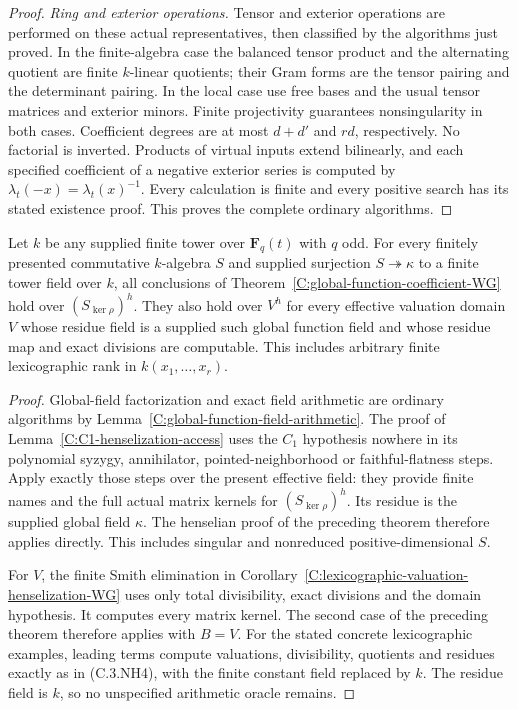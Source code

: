\begin{proof}
\emph{Ring and exterior operations.}
Tensor and exterior operations
are performed on these actual
representatives, then classified
by the algorithms just proved.
In the finite-algebra case the
balanced tensor product and
the alternating quotient are
finite $k$-linear quotients;
their Gram forms are the
tensor pairing and the
determinant pairing.
In the local case use free
bases and the usual tensor
matrices and exterior minors.
Finite projectivity guarantees
nonsingularity in both cases.
Coefficient degrees are at
most $d+d'$ and $rd$,
respectively.
No factorial is inverted.
Products of virtual inputs
extend bilinearly, and each
specified coefficient of a
negative exterior series is
computed by
$\lambda_t(-x)=\lambda_t(x)^{-1}$.
Every calculation is finite
and every positive search
has its stated existence proof.
This proves the complete
ordinary algorithms.
\end{proof}

\begin{corollary}
\label{C:global-function-henselization-WG}
Let $k$ be any supplied finite tower over
$\mathbf F_q(t)$ with $q$ odd.
For every finitely presented commutative
$k$-algebra $S$ and supplied surjection
$S\twoheadrightarrow\kappa$ to a finite
tower field over $k$, all conclusions
of Theorem~\ref{C:global-function-coefficient-WG}
hold over $(S_{\ker\rho})^h$.
They also hold over $V^h$ for every
effective valuation domain $V$ whose
residue field is a supplied such
global function field and whose
residue map and exact divisions
are computable.
This includes arbitrary finite
lexicographic rank in
$k(x_1,\ldots,x_r)$.
\end{corollary}
\begin{proof}
Global-field factorization and
exact field arithmetic are
ordinary algorithms by
Lemma~\ref{C:global-function-field-arithmetic}.
The proof of
Lemma~\ref{C:C1-henselization-access}
uses the $C_1$ hypothesis nowhere
in its polynomial syzygy,
annihilator, pointed-neighborhood
or faithful-flatness steps.
Apply exactly those steps over
the present effective field:
they provide finite names and
the full actual matrix kernels
for $(S_{\ker\rho})^h$.
Its residue is the supplied
global field $\kappa$.
The henselian proof of the
preceding theorem therefore
applies directly.
This includes singular and
nonreduced positive-dimensional
$S$.

For $V$, the finite Smith
elimination in
Corollary~\ref{C:lexicographic-valuation-henselization-WG}
uses only total divisibility,
exact divisions and the
domain hypothesis.
It computes every matrix
kernel.
The second case of the
preceding theorem therefore
applies with $B=V$.
For the stated concrete
lexicographic examples,
leading terms compute
valuations, divisibility,
quotients and residues exactly
as in (C.3.NH4), with the
finite constant field
replaced by $k$.
The residue field is $k$,
so no unspecified arithmetic
oracle remains.
\end{proof}
